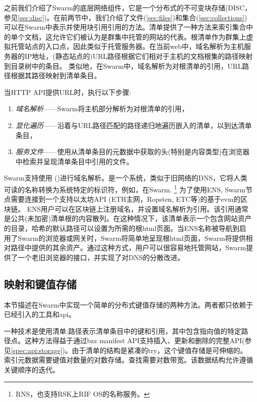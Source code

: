 之前我们介绍了Swarm的底层网络组件，它是一个分布式的不可变块存储(DISC，参见\ref{sec:disc})。在前两节中，我们介绍了文件(\ref{sec:files})和集合(\ref{sec:collections})可以在Swarm中表示并使用块引用引用的方法。清单提供了一种方法来索引集合中的单个文档，这允许它们被认为是群集中托管的网站的代表。根清单作为群集上虚拟托管站点的入口点，因此类似于托管服务器。在当前web中，域名解析为主机服务器的IP地址，(静态站点的)URL路径根据它们相对于主机的文档根集的路径映射到目录树中的条目。
类似地，在Swarm中，域名解析为对根清单的引用，URL路径根据其路径映射到清单条目。  

当HTTP API提供URL时，执行以下步骤:

\begin{enumerate}
    \item \emph{域名解析}——Swarm将主机部分解析为对根清单的引用，
    \item \emph{显化遍历}——沿着与URL路径匹配的路径递归地遍历嵌入的清单，以到达清单条目，
    \item \emph{服务文件}——使用从清单条目的元数据中获取的头(特别是内容类型)在浏览器中检索并呈现清单条目中引用的文件。
\end{enumerate}

Swarm支持使用 ()进行域名解析。是一个系统，类似于旧网络的DNS，它将人类可读的名称转换为系统特定的标识符，例如，在Swarm.%
\footnote{RNS，也支持RSK上RIF OS的名称服务。}
%
为了使用ENS, Swarm节点需要连接到一个支持以太坊API (ETH主网，Ropsten, ETC等)的基于evm的区块链。 
ENS用户可以在区块链上注册域名，并设置域名解析为引用。该引用通常是公共(未加密)清单根的内容散列。在这种情况下，该清单表示一个包含网站资产的目录，哈希的默认路径可以设置为所需的根html页面。当ENS名称被导航到启用了Swarm的浏览器或网关时，Swarm将简单地呈现根html页面，Swarm将提供相对路径中提供的其余资产。通过这种方式，用户可以很容易地托管网站，Swarm提供了一个老旧浏览器的接口，并实现了对DNS的分散改进。


\subsection{映射和键值存储\statusgreen}\label{sec:maps}

本节描述在Swarm中实现一个简单的分布式键值存储的两种方法。两者都只依赖于已经引入的工具和api。

一种技术是使用清单:路径表示清单条目中的键和引用，其中包含指向值的特定路径点。这种方法得益于通过bzz manifest API支持插入、更新和删除的完整API(参见\ref{spec:api:storage})。由于清单的结构是紧凑的try，这个键值存储是可伸缩的。索引元数据需要键值对数量的对数存储。查找需要对数带宽。该数据结构允许遵循关键顺序的迭代。 

